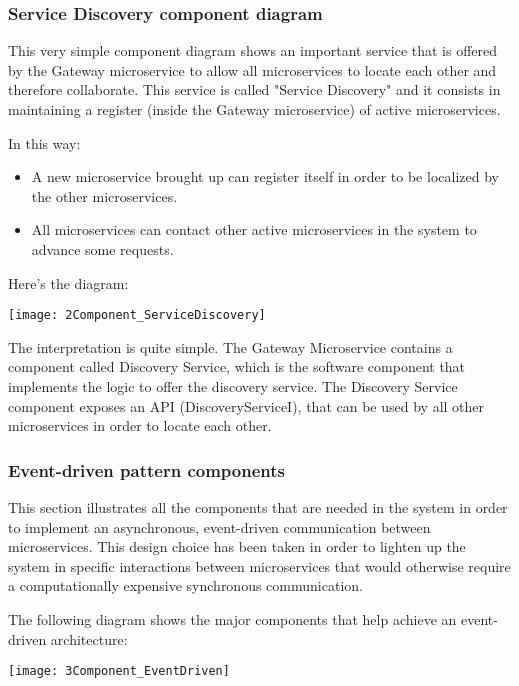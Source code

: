 \subsubsection{Service Discovery component diagram}

\begin{minipage}{\linewidth}
	
	This very simple component diagram shows an important service that is offered by the Gateway microservice to allow all microservices to locate each other and therefore collaborate. This service is called "Service Discovery" and it consists in maintaining a register (inside the Gateway microservice) of active microservices. 
	
	In this way:
	\begin{itemize}
		\item A new microservice brought up can register itself in order to be localized by the other microservices.
		\item All microservices can contact other active microservices in the system to advance some requests.
	\end{itemize}
	
	Here's the diagram:
	
	\vspace{2cm}
	\texttt{[image: 2Component\_ServiceDiscovery]}
	
\end{minipage}

	The interpretation is quite simple. The Gateway Microservice contains a component called Discovery Service, which is the software component that implements the logic to offer the discovery service. The Discovery Service component exposes an API (DiscoveryServiceI), that can be used by all other microservices in order to locate each other. 

\subsubsection{Event-driven pattern components}
\begin{minipage}{\linewidth}
	This section illustrates all the components that are needed in the system in order to implement an asynchronous, event-driven communication between microservices. This design choice has been taken in order to lighten up the system in specific interactions between microservices that would otherwise require a computationally expensive synchronous communication.
	
	The following diagram shows the major components that help achieve an event-driven architecture:
	
	\vspace{2cm}
	\texttt{[image: 3Component\_EventDriven]}
	
	\vspace{2cm}
	
\end{minipage}

